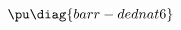 \documentclass[oneside]{article}
\begin{document}
\begin{verbbox}
%
$$\pu
  \def\f{\bar f}
  \def\g{\bar g}
  \def\h{\bar h}
  \let\t\tau
  \diag{barr-dednat6}
$$
\end{verbbox}
\end{document}
